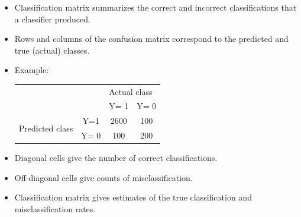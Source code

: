 \documentclass[compress]{beamer}
\begin{document}
%	
%	
%	
%	



\begin{frame}
	\frametitle{}
	\begin{itemize}
  \item Classification matrix summarizes the correct and incorrect classifications
that a classifier produced.
  \item Rows and columns
of the confusion matrix correspond to the predicted and true (actual) classes.
\item Example:\\[-2mm]
\begin{tabular}{cccc}

 &  & \multicolumn{2}{|l}{Actual class} \\
  & & \multicolumn{1}{|c}{Y= 1} &Y= 0 \\\hline
\multirow{2}{*}{Predicted class} & Y=1 & \multicolumn{1}{|c}{2600} & 100 \\
 &Y= 0 & \multicolumn{1}{|c}{100} & 200 \\
\end{tabular}
\item Diagonal cells give the number of
correct classifications.
\item Off-diagonal cells give counts of misclassification.
\item Classification matrix gives estimates of the true classification and misclassification
rates.
\end{itemize}
\end{frame}
\end{document}
